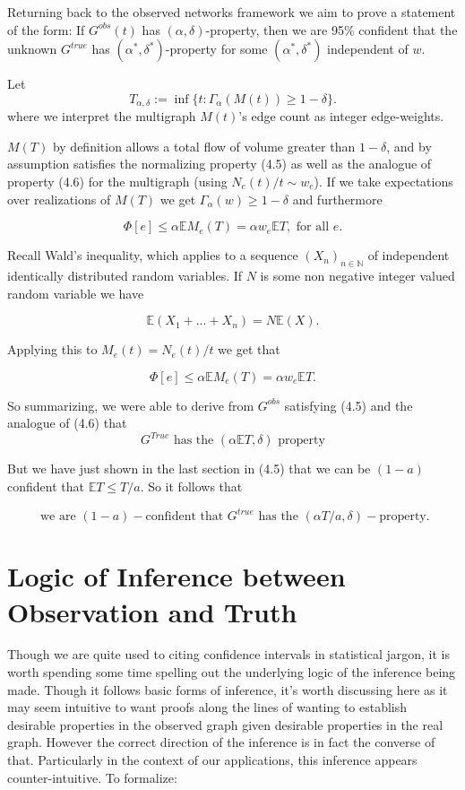 Returning back to the observed networks framework we aim to prove a statement of the form: If $G^{obs}(t)$ has $(\alpha, \delta)$-property, then we are 95\% confident that the unknown $G^{true}$ has $(\alpha^*, \delta^*)$-property for some $(\alpha^*, \delta^*)$ independent of $w$.  

Let $$T_{\alpha, \delta} := \inf \{ t: \Gamma_{\alpha}(M(t)) \geq 1-\delta\}.$$
where we interpret the multigraph $M(t)$'s edge count as integer edge-weights.  

$M(T)$ by definition allows a total flow of volume greater than $1-\delta$, and by assumption satisfies the normalizing property (4.5) as well as the analogue of property (4.6) for the multigraph (using $ N_e(t)/t \sim w_e$). If we take expectations over realizations of $M(T)$ we get $\Gamma_{\alpha}(w) \geq 1-\delta$ and furthermore 

$$ \Phi[e] \leq \alpha \mathbb{E}M_e(T) = \alpha w_e \mathbb{E}T, \text{ for all } e.$$

Recall Wald's inequality, which applies to a sequence $(X_n)_{n \in \mathbb{N}} $ of independent identically distributed random variables. If $N$ is some non negative integer valued random variable we have 

$$ \mathbb{E}(X_1+...+X_n) = N \mathbb{E}(X).$$

Applying this to $M_e(t) = N_e(t)/t$ we get that 

$$ \Phi[e] \leq \alpha \mathbb{E}M_e(T) = \alpha w_e \mathbb{E} T. $$

So summarizing, we were able to derive from $G^{obs}$ satisfying (4.5) and the analogue of (4.6) that $$ G^{True} \text{ has the } (\alpha\mathbb{E} T, \delta) \text{ property}$$

But we have just shown in the last section in (4.5) that we can be $(1-a)$ confident that $\mathbb{E}T \leq T/a$.  So it follows that 

\begin{equation}
\text{ we are } (1-a)-\text{confident that } G^{true} \text{ has the }(\alpha T/a, \delta)-\text{property}.
\end{equation}

\section{Logic of Inference between Observation and Truth}

Though we are quite used to citing confidence intervals in statistical jargon, it is worth spending some time spelling out the underlying logic of the inference being made. Though it follows basic forms of inference, it's worth discussing here as it may seem intuitive to want proofs along the lines of wanting to establish desirable properties in the observed graph given desirable properties in the real graph.  However the correct direction of the inference is in fact the converse of that. Particularly in the context of our applications, this inference appears counter-intuitive.  To formalize:

